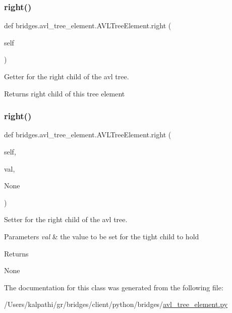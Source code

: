 \subsubsection{\texorpdfstring{right()}{right()}\hspace{0.1cm}{\footnotesize\ttfamily [1/2]}}
{\footnotesize\ttfamily def bridges.\+avl\+\_\+tree\+\_\+element.\+A\+V\+L\+Tree\+Element.\+right (\begin{DoxyParamCaption}\item[{}]{self }\end{DoxyParamCaption})}



Getter for the right child of the avl tree. 

\begin{DoxyReturn}{Returns}
right child of this tree element 
\end{DoxyReturn}
\mbox{\label{classbridges_1_1avl__tree__element_1_1_a_v_l_tree_element_ad9b5962ea5c89c9b91d7767b1b258c8e}} 
\subsubsection{\texorpdfstring{right()}{right()}\hspace{0.1cm}{\footnotesize\ttfamily [2/2]}}
{\footnotesize\ttfamily def bridges.\+avl\+\_\+tree\+\_\+element.\+A\+V\+L\+Tree\+Element.\+right (\begin{DoxyParamCaption}\item[{}]{self,  }\item[{}]{val,  }\item[{}]{None }\end{DoxyParamCaption})}



Setter for the right child of the avl tree. 


\begin{DoxyParams}{Parameters}
{\em val} & the value to be set for the tight child to hold \\
\hline
\end{DoxyParams}
\begin{DoxyReturn}{Returns}


None 
\end{DoxyReturn}


The documentation for this class was generated from the following file\+:\begin{DoxyCompactItemize}
\item 
/\+Users/kalpathi/gr/bridges/client/python/bridges/\mbox{\hyperlink{avl__tree__element_8py}{avl\+\_\+tree\+\_\+element.\+py}}\end{DoxyCompactItemize}
